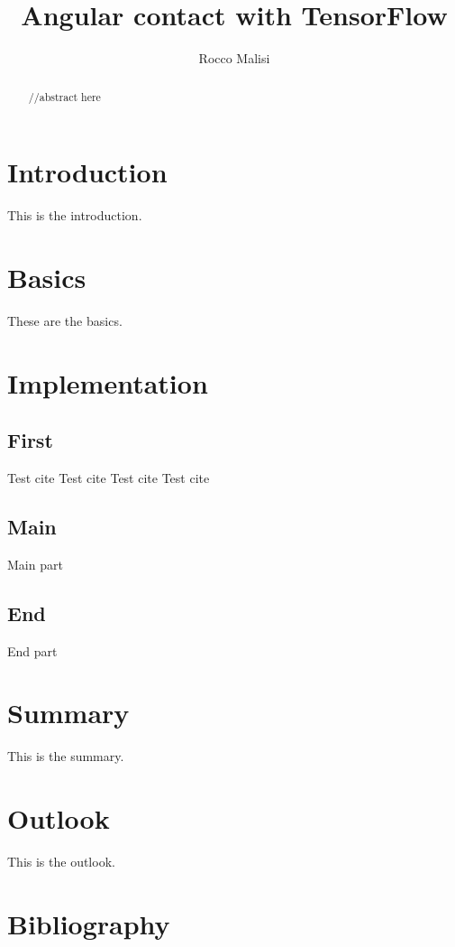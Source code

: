 \documentclass{article}
\title{Angular contact with TensorFlow}
\author{Rocco Malisi}
\begin{document}
\date{}
\maketitle

\newpage

\begin{abstract}
//abstract here
\end{abstract}

\newpage

\tableofcontents

\newpage

\section{Introduction}
This is the introduction.

\newpage

\section{Basics}
These are the basics.

\newpage

\section{Implementation}
\subsection{First}

Test cite \cite{weidman}
Test cite \cite{burkov}
Test cite \cite{james}
Test cite \cite{géron}

\subsection{Main}
Main part
\subsection{End}
End part

\newpage

\section{Summary}
This is the summary.

\newpage

\section{Outlook}
This is the outlook.

\newpage

\section{Bibliography}
\printbibliography 
\end{document}
